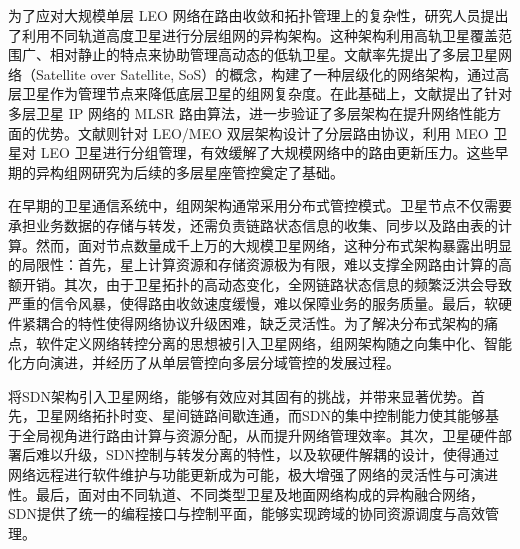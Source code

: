 \documentclass[print, master, vlined]{DissertUESTC}
\begin{document}
    为了应对大规模单层 LEO 网络在路由收敛和拓扑管理上的复杂性，研究人员提出了利用不同轨道高度卫星进行分层组网的异构架构。这种架构利用高轨卫星覆盖范围广、相对静止的特点来协助管理高动态的低轨卫星。文献\cite{lee2000satellite}率先提出了多层卫星网络（Satellite over Satellite, SoS）的概念，构建了一种层级化的网络架构，通过高层卫星作为管理节点来降低底层卫星的组网复杂度。在此基础上，文献\cite{akyildiz2002mlsr}提出了针对多层卫星 IP 网络的 MLSR 路由算法，进一步验证了多层架构在提升网络性能方面的优势。文献\cite{chen2005routing}则针对 LEO/MEO 双层架构设计了分层路由协议，利用 MEO 卫星对 LEO 卫星进行分组管理，有效缓解了大规模网络中的路由更新压力。这些早期的异构组网研究为后续的多层星座管控奠定了基础。

    在早期的卫星通信系统中，组网架构通常采用分布式管控模式。卫星节点不仅需要承担业务数据的存储与转发，还需负责链路状态信息的收集、同步以及路由表的计算。然而，面对节点数量成千上万的大规模卫星网络，这种分布式架构暴露出明显的局限性：首先，星上计算资源和存储资源极为有限，难以支撑全网路由计算的高额开销。其次，由于卫星拓扑的高动态变化，全网链路状态信息的频繁泛洪会导致严重的信令风暴，使得路由收敛速度缓慢，难以保障业务的服务质量。最后，软硬件紧耦合的特性使得网络协议升级困难，缺乏灵活性。为了解决分布式架构的痛点，软件定义网络转控分离的思想被引入卫星网络，组网架构随之向集中化、智能化方向演进，并经历了从单层管控向多层分域管控的发展过程。

    将SDN架构引入卫星网络，能够有效应对其固有的挑战，并带来显著优势。首先，卫星网络拓扑时变、星间链路间歇连通，而SDN的集中控制能力使其能够基于全局视角进行路由计算与资源分配，从而提升网络管理效率。其次，卫星硬件部署后难以升级，SDN控制与转发分离的特性，以及软硬件解耦的设计，使得通过网络远程进行软件维护与功能更新成为可能，极大增强了网络的灵活性与可演进性。最后，面对由不同轨道、不同类型卫星及地面网络构成的异构融合网络，SDN提供了统一的编程接口与控制平面，能够实现跨域的协同资源调度与高效管理。
    
\end{document}
